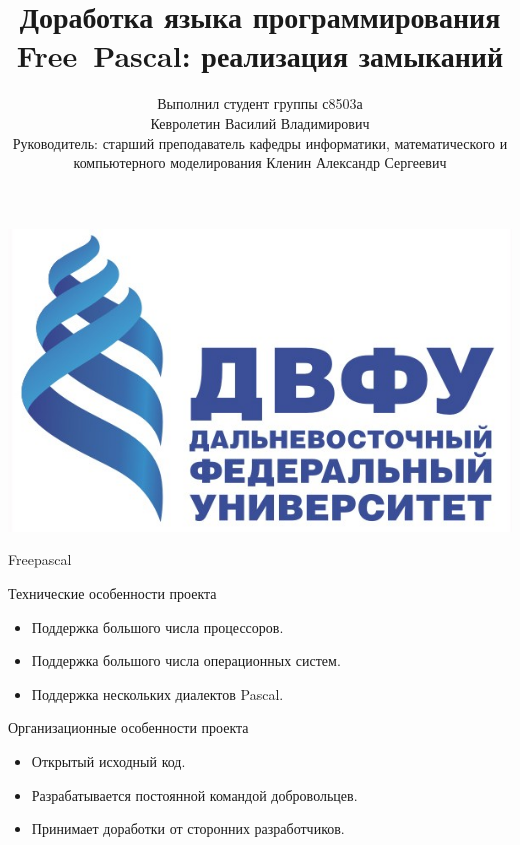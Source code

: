 \documentclass[roman,12pt]{beamer}
\begin{document}
\title{Доработка языка программирования Free~Pascal: реализация замыканий}  
\author{Выполнил студент группы с8503а \\ Кевролетин Василий
  Владимирович\\ Руководитель: старший преподаватель кафедры
  информатики, математического и компьютерного моделирования Кленин
  Александр Сергеевич}

\begin{frame}
\begin{center}
\includegraphics[scale=0.15]{logo.jpeg}
\end{center}
\maketitle

\end{frame}

\begin{frame}{Freepascal}
  \begin{block}{Технические особенности проекта}
    \begin{itemize}
    \item Поддержка большого числа процессоров.
    \item Поддержка большого числа операционных систем.
    \item Поддержка нескольких диалектов Pascal.
    \end{itemize}
  \end{block}
  \begin{block}{Организационные особенности проекта}
    \begin{itemize}
    \item Открытый исходный код.
    \item Разрабатывается постоянной командой добровольцев.
    \item Принимает доработки от сторонних разработчиков.
    \end{itemize}  
  \end{block}
\end{frame}
\end{document}
